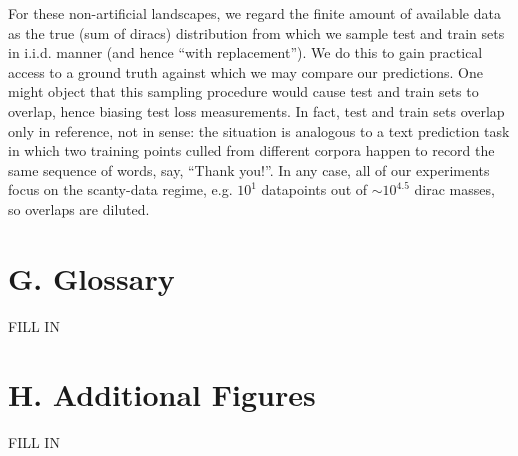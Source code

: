 \documentclass{article}
\begin{document}
    For these non-artificial landscapes, we regard the finite amount of
    available data as the true (sum of diracs) distribution from which we
    sample test and train sets in i.i.d.  manner (and hence ``with
    replacement'').  We do this to gain practical access to a ground truth
    against which we may compare our predictions.  One might object that this
    sampling procedure would cause test and train sets to overlap, hence
    biasing test loss measurements.  In fact, test and train sets overlap only
    in reference, not in sense: the situation is analogous to a text prediction
    task in which two training points culled from different corpora happen to
    record the same sequence of words, say, ``Thank you!''.  In any case, all
    of our experiments focus on the scanty-data regime, e.g. $10^1$ datapoints
    out of $\sim 10^{4.5}$ dirac masses, so overlaps are diluted. 

\section*{G. Glossary}
    {\color{moor} FILL IN}

\section*{H. Additional Figures}
    {\color{moor} FILL IN}
\end{document}
